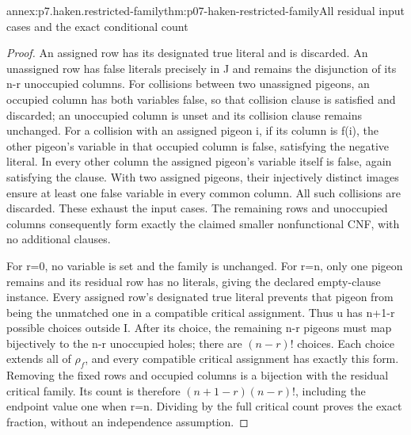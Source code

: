 \begin{annexitem}{annex:p7.haken.restricted-family}{thm:p07-haken-restricted-family}{All residual input cases and the exact conditional count}
\begin{proof}
An assigned row has its designated true literal and is discarded.
An unassigned row has false literals precisely in J and remains
the disjunction of its n-r unoccupied columns. For collisions
between two unassigned pigeons, an occupied column has both
variables false, so that collision clause is satisfied and
discarded; an unoccupied column is unset and its collision
clause remains unchanged. For a collision with an assigned
pigeon i, if its column is f(i), the other pigeon's variable
in that occupied column is false, satisfying the negative
literal. In every other column the assigned pigeon's variable
itself is false, again satisfying the clause. With two assigned
pigeons, their injectively distinct images ensure at least
one false variable in every common column. All such collisions
are discarded. These exhaust the input cases. The remaining
rows and unoccupied columns consequently form exactly the
claimed smaller nonfunctional CNF, with no additional clauses.

For r=0, no variable is set and the family is unchanged.
For r=n, only one pigeon remains and its residual row has
no literals, giving the declared empty-clause instance.
Every assigned row's designated true literal prevents that
pigeon from being the unmatched one in a compatible critical
assignment. Thus u has n+1-r possible choices outside I.
After its choice, the remaining n-r pigeons must map bijectively
to the n-r unoccupied holes; there are \((n-r)!\) choices.
Each choice extends all of \(\rho_f\), and every compatible
critical assignment has exactly this form. Removing the fixed
rows and occupied columns is a bijection with the residual
critical family. Its count is therefore
\((n+1-r)(n-r)!\), including the endpoint value one when
r=n. Dividing by the full critical count proves the exact
fraction, without an independence assumption.
\end{proof}
\end{annexitem}

